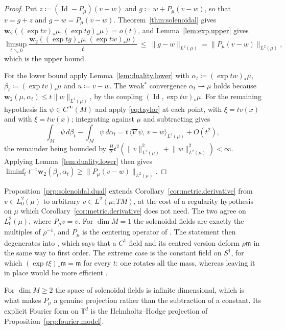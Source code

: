 \documentclass[11pt,reqno]{amsart}
\theoremstyle{plain}
\theoremstyle{definition}
\newcommand{\dw}{\mathbf{w}_2}
\newcommand{\T}{\mathbb{T}}
\newcommand{\Leb}{\mathfrak{m}}
\DeclareMathOperator{\Id}{Id}
\begin{document}
\begin{proof}
    Put \( z\coloneqq(\Id-P_\mu)(v-w) \) and \( g\coloneqq w+P_\mu(v-w) \), so that \( v=g+z \) and \( g-w=P_\mu(v-w) \).
    Theorem~\ref{thm:solenoidal} gives \( \dw\left((\exp tv)_\ast\mu,(\exp tg)_\ast\mu\right)=o(t) \), and Lemma~\ref{lem:exp.upper} gives
    \[
        \limsup_{t\searrow0}\frac{\dw\left((\exp tg)_\ast\mu,(\exp tw)_\ast\mu\right)}{t}\ \le\ \lVert g-w\rVert_{L^2(\mu)}=\big\lVert P_\mu(v-w)\big\rVert_{L^2(\mu)} ,
    \]
    which is the upper bound.

    For the lower bound apply Lemma~\ref{lem:duality.lower} with \( \alpha_t\coloneqq(\exp tw)_\ast\mu \), \( \beta_t\coloneqq(\exp tv)_\ast\mu \) and \( u\coloneqq v-w \).
    The weak\( ^\ast \) convergence \( \alpha_t\rightharpoonup\mu \) holds because \( \dw(\mu,\alpha_t)\le t\lVert w\rVert_{L^2(\mu)} \), by the coupling \( (\Id,\exp tw)_\ast\mu \).
    For the remaining hypothesis fix \( \psi\in C^\infty(M) \) and apply \eqref{eq:taylor} at each point, with \( \xi=tv(x) \) and with \( \xi=tw(x) \); integrating against \( \mu \) and subtracting gives
    \[
        \int_M\psi\,d\beta_t-\int_M\psi\,d\alpha_t=t\,\big\langle\nabla\psi,\,v-w\big\rangle_{L^2(\mu)}+O(t^2),
    \]
    the remainder being bounded by \( \tfrac{H}{2}t^2\left(\lVert v\rVert^2_{L^2(\mu)}+\lVert w\rVert^2_{L^2(\mu)}\right)<\infty \).
    Applying Lemma~\ref{lem:duality.lower} then gives \( \liminf_tt^{-1}\dw(\beta_t,\alpha_t)\ge\lVert P_\mu(v-w)\rVert_{L^2(\mu)} \).
\end{proof}

Proposition~\ref{prp:solenoidal.dual} extends Corollary~\ref{cor:metric.derivative} from \( v\in L^2_0(\mu) \) to arbitrary \( v\in L^2(\mu;TM) \), at the cost of a regularity hypothesis on \( \mu \) which Corollary~\ref{cor:metric.derivative} does not need.
The two agree on \( L^2_0(\mu) \), where \( P_\mu v=v \).
For \( \dim M=1 \) the solenoidal fields are exactly the multiples of \( \rho^{-1} \), and \( P_\mu \) is the centering operator of \cite[\S5.1]{kloeckner_optimal_2013}.
The statement then degenerates into \cite[Proposition 5.2]{kloeckner_optimal_2013}, which says that a \( C^1 \) field and its centred version deform \( \rho\Leb \) in the same way to first order.
The extreme case is the constant field on \( S^1 \), for which \( (\exp t\xi)_\ast\Leb=\Leb \) for every \( t \): one rotates all the mass, whereas leaving it in place would be more efficient \cite[\S3.2]{kloeckner_optimal_2013}.

For \( \dim M\ge2 \) the space of solenoidal fields is infinite dimensional, which is what makes \( P_\mu \) a genuine projection rather than the subtraction of a constant.
Its explicit Fourier form on \( \T^d \) is the Helmholtz--Hodge projection of Proposition~\ref{prp:fourier.model}.
\end{document}
